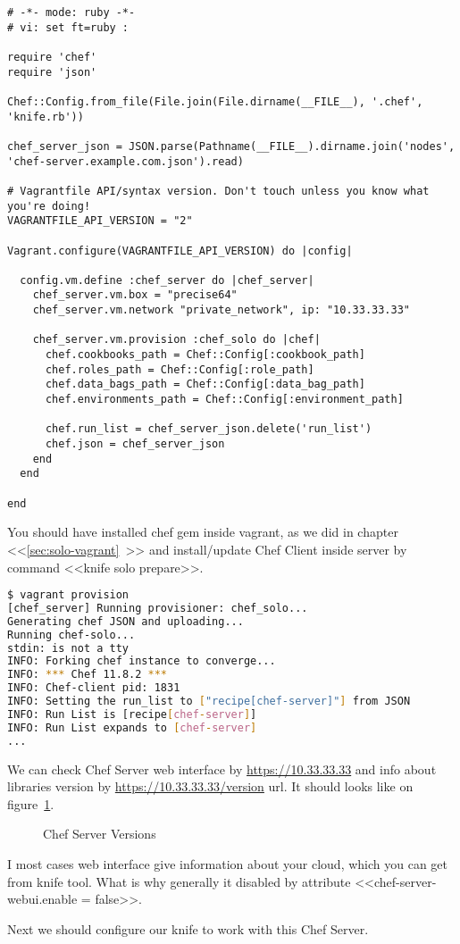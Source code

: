 \begin{lstlisting}[label=lst:my-server-cloud-installation6,title=my-server-cloud/Vagrantfile]
# -*- mode: ruby -*-
# vi: set ft=ruby :

require 'chef'
require 'json'

Chef::Config.from_file(File.join(File.dirname(__FILE__), '.chef', 'knife.rb'))

chef_server_json = JSON.parse(Pathname(__FILE__).dirname.join('nodes', 'chef-server.example.com.json').read)

# Vagrantfile API/syntax version. Don't touch unless you know what you're doing!
VAGRANTFILE_API_VERSION = "2"

Vagrant.configure(VAGRANTFILE_API_VERSION) do |config|

  config.vm.define :chef_server do |chef_server|
    chef_server.vm.box = "precise64"
    chef_server.vm.network "private_network", ip: "10.33.33.33"

    chef_server.vm.provision :chef_solo do |chef|
      chef.cookbooks_path = Chef::Config[:cookbook_path]
      chef.roles_path = Chef::Config[:role_path]
      chef.data_bags_path = Chef::Config[:data_bag_path]
      chef.environments_path = Chef::Config[:environment_path]

      chef.run_list = chef_server_json.delete('run_list')
      chef.json = chef_server_json
    end
  end

end
\end{lstlisting}

You should have installed chef gem inside vagrant, as we did in chapter <<\ref{sec:solo-vagrant}~>> and install/update Chef Client inside server by command <<knife solo prepare>>.

\begin{lstlisting}[language=Bash,label=lst:my-server-cloud-installation7]
$ vagrant provision
[chef_server] Running provisioner: chef_solo...
Generating chef JSON and uploading...
Running chef-solo...
stdin: is not a tty
INFO: Forking chef instance to converge...
INFO: *** Chef 11.8.2 ***
INFO: Chef-client pid: 1831
INFO: Setting the run_list to ["recipe[chef-server]"] from JSON
INFO: Run List is [recipe[chef-server]]
INFO: Run List expands to [chef-server]
...
\end{lstlisting}

We can check Chef Server web interface by \href{https://10.33.33.33}{https://10.33.33.33} and info about libraries version by \href{https://10.33.33.33/version}{https://10.33.33.33/version} url. It should looks like on figure~\ref{fig:chef-server-versions}.

\begin{figure}[ht!]
  \caption{Chef Server Versions}
  \label{fig:chef-server-versions}
\end{figure}

I most cases web interface give information about your cloud, which you can get from knife tool. What is why generally it disabled by attribute <<chef-server-webui.enable = false>>.

Next we should configure our knife to work with this Chef Server.
